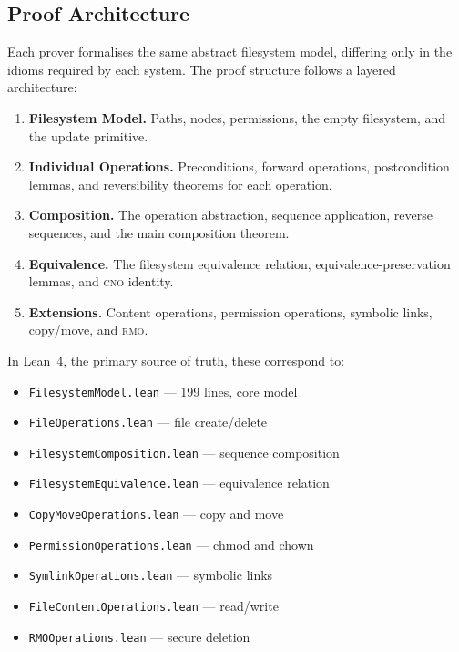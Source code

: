 \documentclass[11pt,a4paper]{article}
\newcommand{\rmo}{\textsc{rmo}}
\newcommand{\cno}{\textsc{cno}}
\newcommand{\lean}{Lean~4}
\begin{document}
\subsection{Proof Architecture}

Each prover formalises the same abstract filesystem model, differing only in
the idioms required by each system. The proof structure follows a layered
architecture:

\begin{enumerate}[label=\textbf{Layer \arabic*:}]
  \item \textbf{Filesystem Model.} Paths, nodes, permissions, the empty
        filesystem, and the update primitive.
  \item \textbf{Individual Operations.} Preconditions, forward operations,
        postcondition lemmas, and reversibility theorems for each operation.
  \item \textbf{Composition.} The operation abstraction, sequence application,
        reverse sequences, and the main composition theorem.
  \item \textbf{Equivalence.} The filesystem equivalence relation,
        equivalence-preservation lemmas, and \cno{} identity.
  \item \textbf{Extensions.} Content operations, permission operations,
        symbolic links, copy/move, and \rmo{}.
\end{enumerate}

In \lean{}, the primary source of truth, these correspond to:
\begin{itemize}
  \item \texttt{FilesystemModel.lean} --- 199 lines, core model
  \item \texttt{FileOperations.lean} --- file create/delete
  \item \texttt{FilesystemComposition.lean} --- sequence composition
  \item \texttt{FilesystemEquivalence.lean} --- equivalence relation
  \item \texttt{CopyMoveOperations.lean} --- copy and move
  \item \texttt{PermissionOperations.lean} --- chmod and chown
  \item \texttt{SymlinkOperations.lean} --- symbolic links
  \item \texttt{FileContentOperations.lean} --- read/write
  \item \texttt{RMOOperations.lean} --- secure deletion
\end{itemize}
\end{document}
